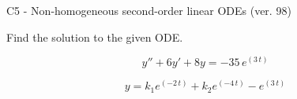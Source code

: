 \begin{exercise}
  \begin{exerciseTitle}C5 - Non-homogeneous second-order linear ODEs (ver. 98)\end{exerciseTitle}
  \begin{exerciseStatement}
    
Find the solution to the given ODE.

    
\[y''+6y'+8y = -35 \, e^{\left(3 \, t\right)}\]

  \end{exerciseStatement}
  \begin{exerciseAnswer}
    
\[y= k_{1} e^{\left(-2 \, t\right)} + k_{2} e^{\left(-4 \, t\right)} - e^{\left(3 \, t\right)}\]

  \end{exerciseAnswer}
\end{exercise}